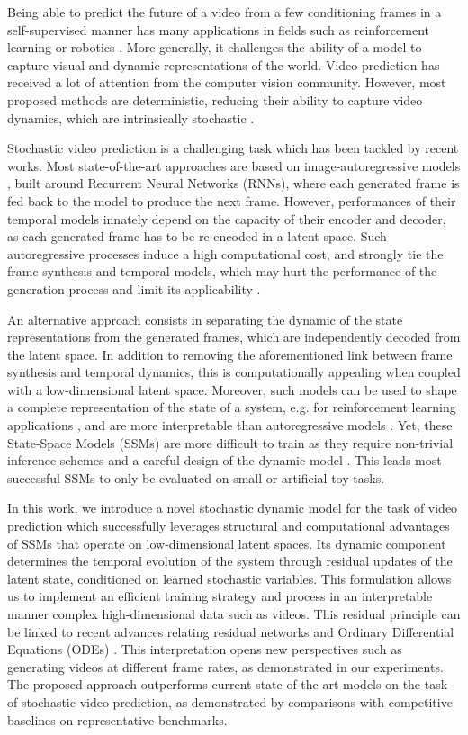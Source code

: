 \documentclass{article}
\begin{document}
Being able to predict the future of a video from a few conditioning frames in a self-supervised manner has many applications in fields such as reinforcement learning \citep{Gregor2019} or robotics \citep{Babaeizadeh2018}.
More generally, it challenges the ability of a model to capture visual and dynamic representations of the world.
Video prediction has received a lot of attention from the computer vision community. 
However, most proposed methods are deterministic, reducing their ability to capture video dynamics, which are intrinsically stochastic \citep{Denton2018}.

Stochastic video prediction is a challenging task which has been tackled by recent works.
Most state-of-the-art approaches are based on image-autoregressive models \citep{Denton2018, Babaeizadeh2018}, built around Recurrent Neural Networks (RNNs), where each generated frame is fed back to the model to produce the next frame.
However, performances of their temporal models innately depend on the capacity of their encoder and decoder, as each generated frame has to be re-encoded in a latent space.
Such autoregressive processes induce a high computational cost, and strongly tie the frame synthesis and temporal models, which may hurt the performance of the generation process and limit its applicability \citep{Gregor2019, Rubanova2019}.

An alternative approach consists in separating the dynamic of the state representations from the generated frames, which are independently decoded from the latent space.
In addition to removing the aforementioned link between frame synthesis and temporal dynamics, this is computationally appealing when coupled with a low-dimensional latent space.
Moreover, such models can be used to shape a complete representation of the state of a system, e.g. for reinforcement learning applications \citep{Gregor2019}, and are more interpretable than autoregressive models \citep{Rubanova2019}.
Yet, these State-Space Models (SSMs) are more difficult to train as they require non-trivial inference schemes \citep{Krishnan2017} and a careful design of the dynamic model \citep{Karl2017}.
This leads most successful SSMs to only be evaluated on small or artificial toy tasks.

In this work, we introduce a novel stochastic dynamic model for the task of video prediction which successfully leverages structural and computational advantages of SSMs that operate on low-dimensional latent spaces.
Its dynamic component determines the temporal evolution of the system through residual updates of the latent state, conditioned on learned stochastic variables.
This formulation allows us to implement an efficient training strategy and process in an interpretable manner complex high-dimensional data such as videos.
This residual principle can be linked to recent advances relating residual networks and Ordinary Differential Equations (ODEs) \citep{Chen2018}.
This interpretation opens new perspectives such as generating videos at different frame rates, as demonstrated in our experiments.
The proposed approach outperforms current state-of-the-art models on the task of stochastic video prediction, as demonstrated by comparisons with competitive baselines on representative benchmarks.
 
\end{document}
